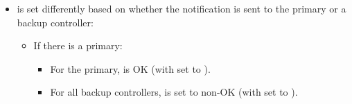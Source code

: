 \documentclass[11pt]{article}
\begin{document}
{\begin{itemize}
\begin{itemize}
\item{}
If there has not been any primary at all, the election\_id is left unset.%

\item{}
Otherwise,  is set to the highest election ID that the server
has seen for this  and  (which is the  of
the current primary if there is any).%
\end{itemize}%

\item{}
 is set differently based on whether the notification is sent to the
primary or a backup controller:%

\begin{itemize}%

\item{}
If there is a primary:%

\begin{itemize}%

\item{}
For the primary,  is OK (with  set to
).%

\item{}
For all backup controllers,  is set to non-OK (with
 set to ).%
\end{itemize}%


\end{itemize}
\end{itemize}}
\end{document}
